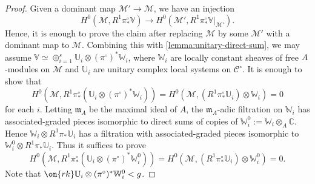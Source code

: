 \begin{proof}
	Given a dominant map $\mathscr M' \to \mathscr M$,
	we have an injection $$H^0(\mathscr M, R^1 \pi^\circ_* \mathbb
	V) \to H^0(\mathscr M', R^1 \pi^\circ_* \mathbb V|_{\mathscr M'}).$$
	Hence, it is enough to prove the claim after replacing $\mathscr M$ by
	some $\mathscr M'$ with a dominant map to  $\mathscr M$.
	Combining this with \autoref{lemma:unitary-direct-sum}, we may assume $\mathbb V \simeq \oplus_{i=1}^s \mathbb U_i
\otimes (\pi^\circ)^* \mathbb
	W_i$, where $\mathbb W_i$ are locally constant sheaves of free $A$-modules on $\mathscr M$ and
	$\mathbb U_i$ are unitary complex local systems on $\mathscr C^\circ$.
	It is enough to show that
	$$H^0(\mathscr{M}, R^1\pi^\circ_*(\mathbb{U}_i\otimes
	(\pi^\circ)^*\mathbb{W}_i))=H^0(\mathscr{M},
	(R^1\pi^\circ_*\mathbb{U}_i)
	\otimes \mathbb{W}_i )=0$$ for each $i$.
	Letting $\mathfrak{m}_A$ be the maximal ideal of $A$, the $\mathfrak{m}_A$-adic filtration on $\mathbb{W}_i$ has associated-graded pieces isomorphic to direct sums of copies of $\mathbb{W}_i^0:=\mathbb{W}_i\otimes_A\mathbb{C}.$
	Hence $\mathbb W_i\otimes R^1\pi_*\mathbb{U}_i$ has a filtration with associated-graded pieces isomorphic to $\mathbb{W}_i^0\otimes R^1\pi_*\mathbb{U}_i$.
	Thus it suffices to prove  $$H^0(\mathscr{M},
	R^1\pi^\circ_*(\mathbb{U}_i\otimes
	(\pi^\circ)^*\mathbb{W}^0_i))=H^0(\mathscr{M}, (R^1\pi^\circ_*\mathbb{U}_i) \otimes \mathbb W^0_i)=0.$$
	 Note that $\on{rk} \mathbb{U}_i\otimes (\pi^\circ)^*\mathbb{W}^0_i<g$.


\end{proof}
